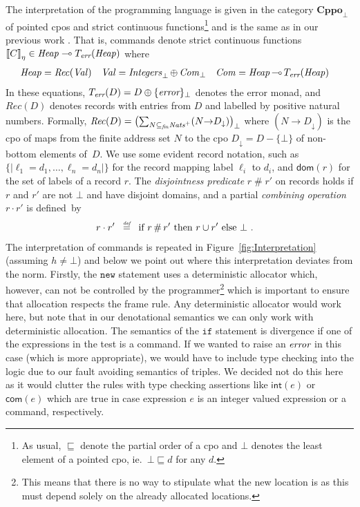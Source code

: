 \documentclass{LMCS}
\theoremstyle{remark}
\newcommand{\Val}{\ensuremath{\mathit{Val}}\xspace}
\newcommand{\Com}{\ensuremath{\mathit{Com}}\xspace}
\newcommand{\ERR}{\ensuremath{\mbox{\it error}}\xspace}
\newcommand{\SYN}[1]{\ensuremath{\texttt{#1}}}
\renewcommand{\l}{\ensuremath{\ell}\xspace}
\newcommand{\defeq}{\ensuremath{\stackrel{\mbox{\tiny \it def}}{=}}}
\newcommand{\Rec}[1]{\ensuremath{\mathit{Rec}(#1)}}
\newcommand{\record}[1]{\ensuremath{\left.\!\{\!|{#1}|\!\}\right.\!}}
\newcommand{\dom}[1]{\ensuremath{\mathsf{dom}({#1})}}
\newcommand{\unlift}[1]{\ensuremath{#1_\downarrow}}
\newcommand{\lift}[1]{\ensuremath{#1_\bot}}
\newcommand{\COMB}{\ensuremath{\cdot}}
\newcommand{\DISJ}{\ensuremath{\mathop{\#}}}
\newcommand{\TERR}{\ensuremath{T_\textit{err}}\xspace}
\newcommand{\Cppo}{\ensuremath{\textbf{Cppo}}\xspace}
\newcommand{\Nats}{\ensuremath{\mathit{Nats}^{\scriptsize +}}\xspace}
\newcommand{\Ints}{\ensuremath{\mathit{Integers}}\xspace}
\newcommand{\sto}{\ensuremath{\multimap}}
\newcommand{\den}[1]{\left\llbracket #1
  \right\rrbracket}
\begin{document}
The interpretation of the programming language is given in the category $\Cppo_\bot$ of pointed cpos and strict continuous functions\footnote{As usual, $\sqsubseteq$    denote the partial order of a cpo and   $\bot$  denotes the least element of a pointed cpo, ie.\ $\bot \sqsubseteq d$ for any $d$.}  and is the same as in our previous work \cite{Birkedal:Reus:Schwinghammer:Yang:08}. That is, commands denote strict continuous functions 
$\den{C}_\eta\in \Heap \sto \TERR(\Heap)$
where 
\begin{align}
\label{eqn:domain-eqn}
\Heap &= \Rec\Val 
&
\Val &= \lift{\Ints} \,{\oplus}\, \lift\Com 
&
\Com &= \Heap\,{\sto}\,\TERR(\Heap) 
\end{align}
In these equations,  $\TERR(D) = D\oplus\lift{\{\ERR\}}$ denotes the 
error monad, and $\Rec D$ denotes records with entries from $D$
and labelled by positive natural numbers. {Formally, 
$\Rec{D} = \lift{\bigl(\textstyle{\sum_{N\subseteq_\mathit{fin}\Nats}(N{\to}\unlift D)}\bigr)}$ where $(N{\to}\unlift D)$ is the cpo of maps from the finite
address set $N$ to the cpo $\unlift D = D{-}\{\bot\}$  of non-bottom 
elements of~$D$.}
We use some evident record notation, such as 
$\record{\l_1{=}d_1,\ldots, \l_n{=}d_n}$
for the record mapping label $\l_i$ to $d_i$, and $\dom r$ for the set of labels of a record $r$. The \emph{disjointness predicate} $r\DISJ r'$ on records holds if $r$ and $r'$ are not $\bot$ and have disjoint domains, and a 
partial \emph{combining operation} $r\COMB r'$ is defined~by 
\begin{align*}
r\COMB r' &\;\;\defeq\;\; 
\text{if $r\DISJ r'$ then $r\cup r'$ else $\bot$ }.
\end{align*} 
The interpretation of commands is repeated in Figure~\ref{fig:Interpretation} (assuming $h\neq\bot$) and below we
point out where this interpretation deviates from the norm.
Firstly, the $\SYN{new}$ statement uses a deterministic allocator which, however, can not be controlled by the programmer\footnote{This
means that there is no way to stipulate what the new location is as this must  depend solely on the already allocated locations.} 
which is important to ensure that allocation respects the frame rule. Any deterministic allocator would work here, but note that in our denotational semantics
we can only work with deterministic allocation.
The semantics of the \SYN{if} statement is divergence if one of the expressions in the test is a command.
If we wanted to raise an $\ERR$ in this case (which is more appropriate), we would have to include type checking into the logic
 due to our fault avoiding semantics of triples. We decided not do this here as it would
clutter the  rules with  type checking assertions like $\mathsf{int}( e)$ or $\mathsf{com}( e)$ which  are true
in case expression $e$ is an integer valued expression or a command, respectively.
\end{document}
